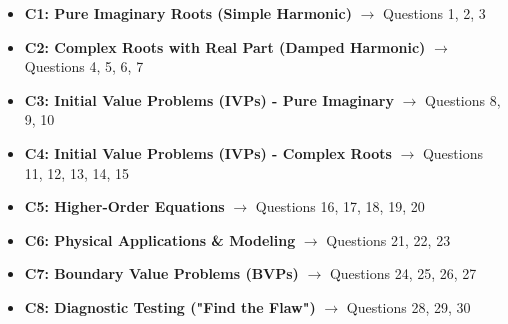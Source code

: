 \documentclass[11pt]{article}
\begin{document}
\begin{itemize}
    \item \textbf{C1: Pure Imaginary Roots (Simple Harmonic)} $\rightarrow$ Questions 1, 2, 3
    \item \textbf{C2: Complex Roots with Real Part (Damped Harmonic)} $\rightarrow$ Questions 4, 5, 6, 7
    \item \textbf{C3: Initial Value Problems (IVPs) - Pure Imaginary} $\rightarrow$ Questions 8, 9, 10
    \item \textbf{C4: Initial Value Problems (IVPs) - Complex Roots} $\rightarrow$ Questions 11, 12, 13, 14, 15
    \item \textbf{C5: Higher-Order Equations} $\rightarrow$ Questions 16, 17, 18, 19, 20
    \item \textbf{C6: Physical Applications \& Modeling} $\rightarrow$ Questions 21, 22, 23
    \item \textbf{C7: Boundary Value Problems (BVPs)} $\rightarrow$ Questions 24, 25, 26, 27
    \item \textbf{C8: Diagnostic Testing ("Find the Flaw")} $\rightarrow$ Questions 28, 29, 30
\end{itemize}
\end{document}
